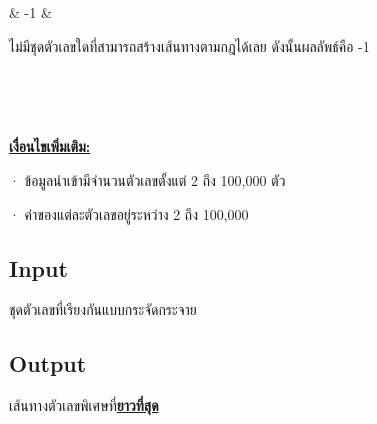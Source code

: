 \documentclass{article}
\begin{document}
{\begin{longtable}[]
\begin{minipage}[t]{\linewidth}
\strut

\end{minipage} & -1 & \begin{minipage}[t]{\linewidth}\raggedright

ไม่มีชุดตัวเลขใดที่สามารถสร้างเส้นทางตามกฎได้เลย ดังนั้นผลลัพธ์คือ -1\\

\strut \\

\strut

\end{minipage} \\

\end{longtable}

}



\hfill\break



\textbf{\ul{{เงื่อนไขเพิ่มเติม:}}}



· ข้อมูลนำเข้ามีจำนวนตัวเลขตั้งแต่ 2 ถึง 100,000 ตัว



· ค่าของแต่ละตัวเลขอยู่ระหว่าง 2 ถึง 100,000



\subsection*{Input}
ชุดตัวเลขที่เรียงกันแบบกระจัดกระจาย



\subsection*{Output}
เส้นทางตัวเลขพิเศษที่\textbf{\ul{ยาวที่สุด}}\\
\end{document}

